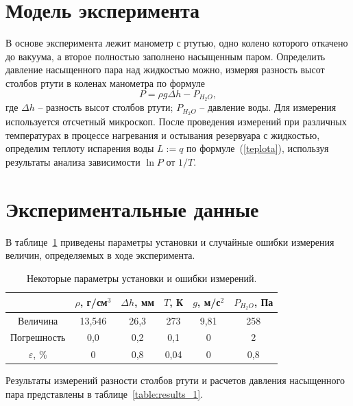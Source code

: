 \documentclass[a4paper,12pt]{article} %
\begin{document}
\section{Модель эксперимента}
	В основе эксперимента лежит манометр с ртутью, одно колено которого  откачено до вакуума,  а  второе  полностью  заполнено насыщенным паром. Определить давление насыщенного пара над жидкостью можно, измеряя разность высот столбов ртути в коленах манометра по формуле
\begin{equation}
	P = \rho g \Delta h - P_{H_2O},
\end{equation}	
где $\Delta h$ -- разность высот  столбов ртути; $P_{H_2O}$ -- давление воды.  Для  измерения используется  отсчетный  микроскоп. После проведения измерений при различных температурах в процессе нагревания и остывания резервуара с жидкостью, определим теплоту испарения воды $L:=q$ по формуле~(\ref{teplota}), используя результаты анализа зависимости $\ln P$ от $1/T$.

\section{Экспериментальные данные}
	В таблице~\ref{table:parametri} приведены параметры установки и случайные ошибки измерения величин, определяемых в ходе эксперимента.


\begin{table}[H]
\caption{Некоторые параметры установки и ошибки измерений.}
\label{table:parametri}
\begin{tabular}{|c|c|c|c|c|c|}
\hline
               & $\rho$, г/см$^3$ & $\Delta h$, мм & $T$, К & $g$, м/с$^2$ & $P_{H_2O}$, Па \\ \hline
Величина       & 13,546           & 26,3           & 273    & 9,81         & 258            \\ \hline
Погрешность    & 0,0              & 0,2            & 0,1    & 0            & 2              \\ \hline
$\varepsilon$, \% & 0                & 0,8            & 0,04   & 0            & 0,8            \\ \hline
\end{tabular}
\end{table}	
	Результаты измерений разности столбов ртути и расчетов давления насыщенного пара представлены в таблице~\ref{table:results_1}.
\end{document}

